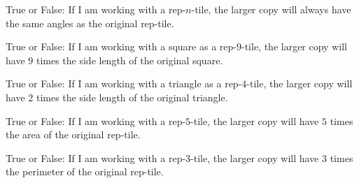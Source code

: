 \documentclass{ximera}
\author{Bart Snapp}
\begin{document}
\maketitle


\begin{exercise}
  True or False: If I am working with a rep-$n$-tile, the larger copy
  will always have the same angles as the original rep-tile.
\end{exercise}
\vfill

\begin{exercise}
  True or False: If I am working with a square as a rep-$9$-tile, the
  larger copy will have $9$ times the side length of the original
  square.
\end{exercise}
\vfill


\begin{exercise}
  True or False: If I am working with a triangle as a rep-$4$-tile,
  the larger copy will have $2$ times the side length of the original
  triangle.
\end{exercise}
\vfill




\begin{exercise}
  True or False: If I am working with a rep-$5$-tile, the larger copy
  will have $5$ times the area of the original rep-tile.
\end{exercise}
\vfill


\begin{exercise}
  True or False: If I am working with a rep-$3$-tile, the larger copy
  will have $3$ times the perimeter of the original rep-tile.
\end{exercise}
\vfill








\end{document}
